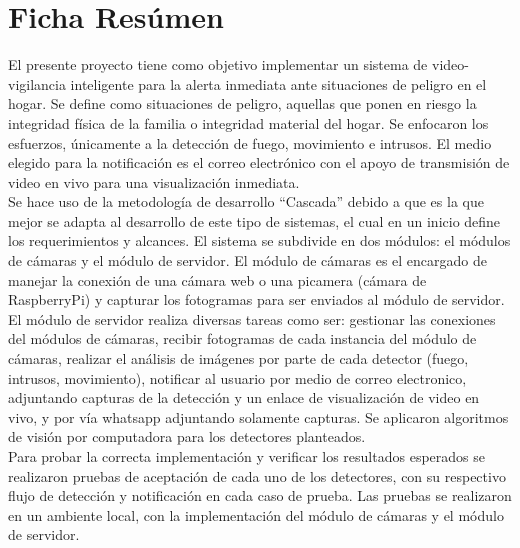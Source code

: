 \chapter{\centering Ficha Resúmen}

\begin{center}
    \begin{minipage}{14cm}

    El presente proyecto tiene como objetivo implementar un sistema de video-vigilancia inteligente para la alerta inmediata ante situaciones de peligro en el hogar. Se define como situaciones de peligro, aquellas que ponen en riesgo la integridad física de la familia o integridad material del hogar. Se enfocaron los esfuerzos, únicamente a la detección de fuego, movimiento e intrusos. El medio elegido para la notificación es el correo electrónico con el apoyo de transmisión de video en vivo para una visualización inmediata.\\

    Se hace uso de la metodología de desarrollo ``Cascada'' debido a que es la que mejor se adapta al desarrollo de este tipo de sistemas, el cual en un inicio define los requerimientos y alcances. El sistema se subdivide en dos módulos: el módulos de cámaras y el módulo de servidor.  El módulo de cámaras es el encargado de manejar la conexión de una cámara web o una picamera (cámara de RaspberryPi) y capturar los fotogramas para ser enviados al módulo de servidor. El módulo de servidor realiza diversas tareas como ser: gestionar las conexiones del módulos de cámaras, recibir fotogramas de cada instancia del módulo de cámaras, realizar el análisis de imágenes por parte de cada detector (fuego, intrusos, movimiento), notificar al usuario por medio de correo electronico, adjuntando capturas de la detección y un enlace de visualización de video en vivo, y por vía whatsapp adjuntando solamente capturas. Se aplicaron algoritmos de visión por computadora para los detectores planteados.\\

    Para probar la correcta implementación y verificar los resultados esperados se realizaron pruebas de aceptación de cada uno de los detectores, con su respectivo flujo de detección y notificación en cada caso de prueba. Las pruebas se realizaron en un ambiente local, con la implementación del módulo de cámaras y el módulo de servidor.\\
    \end{minipage}
\end{center}